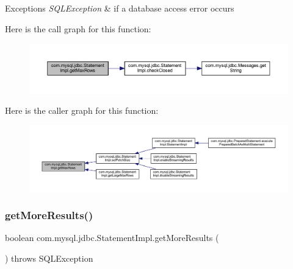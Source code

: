 \begin{DoxyExceptions}{Exceptions}
{\em S\+Q\+L\+Exception} & if a database access error occurs \\
\hline
\end{DoxyExceptions}
Here is the call graph for this function\+:
\nopagebreak
\begin{figure}[H]
\begin{center}
\leavevmode
\includegraphics[width=350pt]{classcom_1_1mysql_1_1jdbc_1_1_statement_impl_a5961bd894f79a6b3e2dedc7726527aab_cgraph}
\end{center}
\end{figure}
Here is the caller graph for this function\+:
\nopagebreak
\begin{figure}[H]
\begin{center}
\leavevmode
\includegraphics[width=350pt]{classcom_1_1mysql_1_1jdbc_1_1_statement_impl_a5961bd894f79a6b3e2dedc7726527aab_icgraph}
\end{center}
\end{figure}
\mbox{\label{classcom_1_1mysql_1_1jdbc_1_1_statement_impl_a49e87d562e35a0c85702f533fa1cd5df}} 
\subsubsection{\texorpdfstring{get\+More\+Results()}{getMoreResults()}\hspace{0.1cm}{\footnotesize\ttfamily [1/2]}}
{\footnotesize\ttfamily boolean com.\+mysql.\+jdbc.\+Statement\+Impl.\+get\+More\+Results (\begin{DoxyParamCaption}{ }\end{DoxyParamCaption}) throws S\+Q\+L\+Exception}


